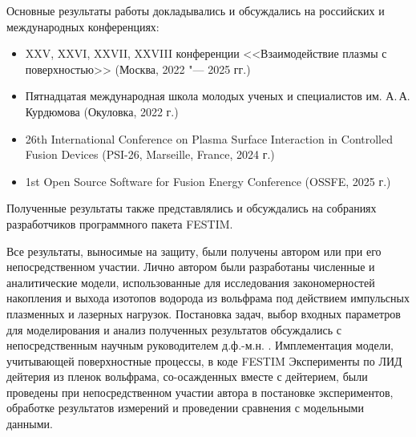 {\probation}
Основные результаты работы докладывались и обсуждались на российских и международных конференциях:
\begin{itemize}
    \item XXV, XXVI, XXVII, XXVIII конференции <<Взаимодействие плазмы с поверхностью>> (Москва, 2022 "--- 2025 гг.)
    \item Пятнадцатая международная школа молодых ученых и специалистов им. А.\,А. Курдюмова (Окуловка, 2022 г.)
    \item 26th International Conference on Plasma Surface Interaction in Controlled Fusion Devices (PSI-26, Marseille, France, 2024 г.)
    \item 1st Open Source Software for Fusion Energy Conference (OSSFE, 2025 г.) 
\end{itemize}

Полученные результаты также представлялись и обсуждались на собраниях разработчиков программного пакета FESTIM.

{\contribution} Все результаты, выносимые на защиту, были получены автором или при его непосредственном участии. Лично автором были разработаны 
численные и аналитические модели, использованные для исследования закономерностей накопления и выхода изотопов водорода из вольфрама под действием 
импульсных плазменных и лазерных нагрузок. Постановка задач, выбор входных параметров для моделирования и анализ полученных результатов 
обсуждались с непосредственным научным руководителем д.ф.-м.н. \supervisorFioShort. Имплементация модели, учитывающей поверхностные 
процессы, в коде FESTIM  Эксперименты по ЛИД дейтерия из пленок вольфрама, со-осажденных вместе с дейтерием,
были проведены  при непосредственном участии автора в постановке экспериментов, обработке результатов измерений 
и проведении сравнения с модельными данными.


